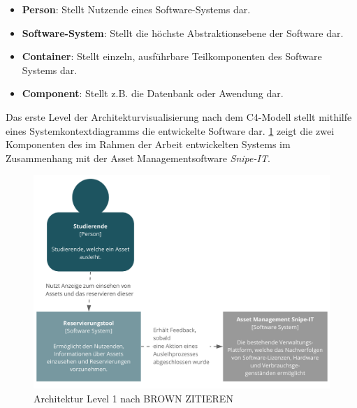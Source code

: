 \begin{itemize}
    \item \textbf{Person}: Stellt Nutzende eines Software-Systems dar.
    \item \textbf{Software-System}: Stellt die höchste Abstraktionsebene der Software dar.
    \item \textbf{Container}: Stellt einzeln, ausführbare Teilkomponenten des Software Systems dar. 
    \item \textbf{Component}: Stellt z.B. die Datenbank oder Awendung dar.
\end{itemize}

{\sffamily\color{maincolor}{Level 1: Context}} 

Das erste Level der Architekturvisualisierung nach dem C4-Modell stellt mithilfe eines
Systemkontextdiagramms die entwickelte Software dar. \ref{fig:level1} zeigt die zwei Komponenten
des im Rahmen der Arbeit entwickelten Systems im Zusammenhang mit der Asset Managementsoftware
\textit{Snipe-IT}.

\begin{figure}[h]
    \centering
    \includegraphics[scale=0.4]{Bilder/level1.pdf}
    \caption[Architektur Level 1]{Architektur Level 1 nach BROWN ZITIEREN}
    \label{fig:level1}
\end{figure}

